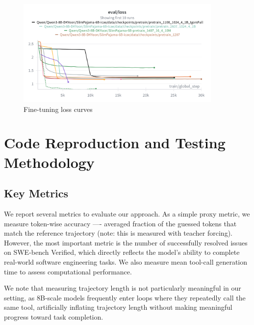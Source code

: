 \begin{figure}[hbt]
  \centering
  \includegraphics[width=0.9\textwidth]{graphs/ft_losses.png}
  \caption{Fine-tuning loss curves}
  \label{fig:ft_losses}
\end{figure}


\section{Code Reproduction and Testing Methodology}

\subsection{Key Metrics}
We report several metrics to evaluate our approach.
As a simple proxy metric, we measure token-wise accuracy —- averaged fraction of the guessed tokens that match the reference trajectory (note: this is measured with teacher forcing).
However, the most important metric is the number of successfully resolved issues on SWE-bench Verified, which directly reflects the model's ability to complete real-world software engineering tasks.
We also measure mean tool-call generation time to assess computational performance.

We note that measuring trajectory length is not particularly meaningful in our setting, as 8B-scale models frequently enter loops where they repeatedly call the same tool, artificially inflating trajectory length without making meaningful progress toward task completion.



